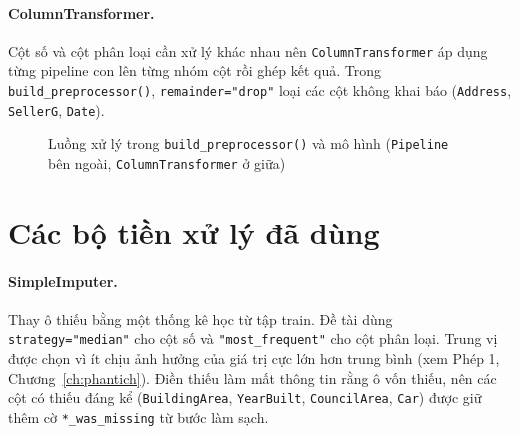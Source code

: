 \paragraph{ColumnTransformer.} Cột số và cột phân loại cần xử lý khác nhau nên \texttt{ColumnTransformer} áp dụng từng pipeline con lên từng nhóm cột rồi ghép kết quả. Trong \texttt{build\_preprocessor()}, \texttt{remainder="drop"} loại các cột không khai báo (\texttt{Address}, \texttt{SellerG}, \texttt{Date}).

\begin{figure}[H]
\centering
{}
\caption{Luồng xử lý trong \texttt{build\_preprocessor()} và mô hình (\texttt{Pipeline} bên ngoài, \texttt{ColumnTransformer} ở giữa)}\label{fig:luong}
\end{figure}

\section{Các bộ tiền xử lý đã dùng}\label{sec:tienxuly}
\paragraph{SimpleImputer.} Thay ô thiếu bằng một thống kê học từ tập train. Đề tài dùng \texttt{strategy="median"} cho cột số và \texttt{"most\_frequent"} cho cột phân loại. Trung vị được chọn vì ít chịu ảnh hưởng của giá trị cực lớn hơn trung bình (xem Phép 1, Chương~\ref{ch:phantich}). Điền thiếu làm mất thông tin rằng ô vốn thiếu, nên các cột có thiếu đáng kể (\texttt{BuildingArea}, \texttt{YearBuilt}, \texttt{CouncilArea}, \texttt{Car}) được giữ thêm cờ \texttt{*\_was\_missing} từ bước làm sạch.

